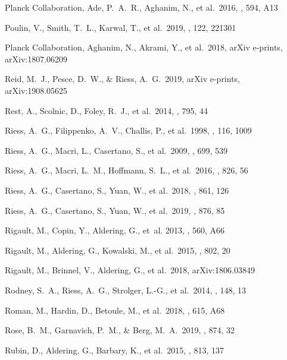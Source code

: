\documentclass[]{aa} %
\begin{document}
\begin{thebibliography}{}
 Planck Collaboration, Ade, P.~A.~R., Aghanim, N., et al.\ 2016, \aap, 594, A13

 Poulin, V., Smith, T.~L., Karwal, T., et al.\ 2019, \prl, 122, 221301

 Planck Collaboration, Aghanim, N., Akrami, Y., et al.\ 2018, arXiv e-prints, arXiv:1807.06209

 Reid, M.~J., Pesce, D.~W., \& Riess, A.~G.\ 2019, arXiv e-prints, arXiv:1908.05625

 Rest, A., Scolnic, D., Foley, R.~J., et al.\ 2014, \apj, 795, 44

 Riess, A.~G., Filippenko, A.~V., Challis, P., et al.\ 1998, \aj, 116, 1009

 Riess, A.~G., Macri, L., Casertano, S., et al.\ 2009, \apj, 699, 539

 Riess, A.~G., Macri, L.~M., Hoffmann, S.~L., et al.\ 2016, \apj, 826, 56

 Riess, A.~G., Casertano, S., Yuan, W., et al.\ 2018, \apj, 861, 126

 Riess, A.~G., Casertano, S., Yuan, W., et al.\ 2019, \apj, 876, 85

Rigault, M., Copin, Y., Aldering, G., {et~al.} 2013, \aap, 560, A66

 Rigault, M., Aldering, G., Kowalski, M., et al.\ 2015, \apj, 802, 20

 Rigault, M.,
  Brinnel, V., Aldering, G., et al.\ 2018, arXiv:1806.03849

 Rodney, S.~A.,
  Riess, A.~G., Strolger, L.-G., et al.\ 2014, \aj, 148, 13 
  
 Roman, M., Hardin, D., Betoule, M., et al.\ 2018, \aap, 615, A68

 Rose, B.~M., Garnavich, P.~M., \& Berg, M.~A.\ 2019, \apj, 874, 32


 Rubin, D., Aldering, G., Barbary, K., et al.\ 2015, \apj, 813, 137


\end{thebibliography}
\end{document}

